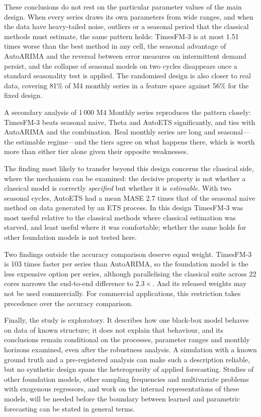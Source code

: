 \documentclass[11pt]{article}
\begin{document}
These conclusions do not rest on the particular parameter values of the main design. When every
series draws its own parameters from wide ranges, and when the data have heavy-tailed noise,
outliers or a seasonal period that the classical methods must estimate, the same pattern holds:
TimesFM-3 is at most 1.51 times worse than the best method in any cell, the seasonal advantage of
AutoARIMA and the reversal between error measures on intermittent demand persist, and the collapse
of seasonal models on two cycles disappears once a standard seasonality test is applied. The
randomised design is also closer to real data, covering 81\% of M4 monthly series in a feature
space against 56\% for the fixed design.

A secondary analysis of 1\,000 M4 Monthly series reproduces the pattern closely: TimesFM-3 beats
seasonal naive, Theta and AutoETS significantly, and ties with AutoARIMA and the combination.
Real monthly series are long and seasonal---the estimable regime---and the tiers agree on what
happens there, which is worth more than either tier alone given their opposite weaknesses.

The finding most likely to transfer beyond this design concerns the classical side, where the
mechanism can be examined: the decisive property is not whether a classical model is correctly
\emph{specified} but whether it is \emph{estimable}. With two seasonal cycles, AutoETS had a mean
MASE 2.7 times that of the seasonal naive method on data generated by an ETS process. In this
design TimesFM-3 was most useful relative to the classical methods where classical estimation was
starved, and least useful where it was comfortable; whether the same holds for other foundation
models is not tested here.

Two findings outside the accuracy comparison deserve equal weight. TimesFM-3 is 103 times
faster per series than AutoARIMA, so the foundation model is the less expensive option per series,
although parallelising the classical suite across 22 cores narrows the end-to-end difference to
$2.3\times$. And its released weights may not be used commercially. For commercial applications,
this restriction takes precedence over the accuracy comparison.

Finally, the study is exploratory. It describes how one black-box model behaves on data of
known structure; it does not explain that behaviour, and its conclusions remain conditional on the
processes, parameter ranges and monthly horizons examined, even after the robustness analysis. A
simulation with a known ground truth and a pre-registered analysis can make such a description
reliable, but no synthetic design spans the heterogeneity of applied forecasting. Studies of other
foundation models, other sampling frequencies and multivariate problems with exogenous
regressors, and work on the internal representations of these models, will be needed before the
boundary between learned and parametric forecasting can be stated in general terms.
\end{document}
